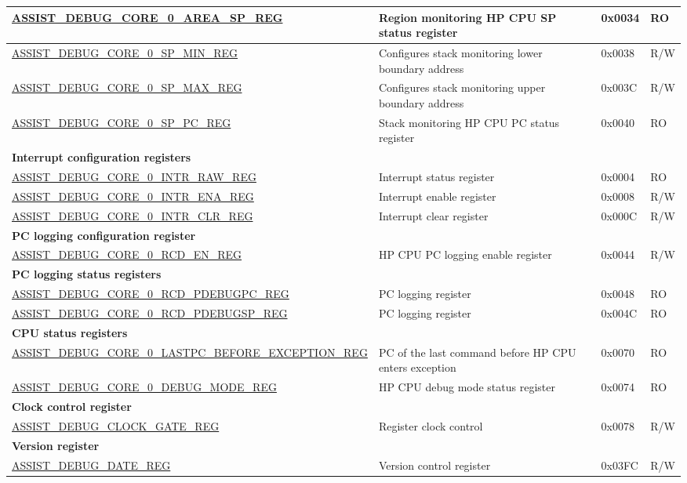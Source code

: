 \begin{longtable}{ | l| m{4cm} | l | l | }
\hyperref[regdesc:ASSISTDEBUGCORE0AREASPREG]{ASSIST\_DEBUG\_CORE\_0\_AREA\_SP\_REG} & Region monitoring HP CPU SP status register & 0x0034 & RO \\ \hline
\hyperref[regdesc:ASSISTDEBUGCORE0SPMINREG]{ASSIST\_DEBUG\_CORE\_0\_SP\_MIN\_REG} & Configures stack monitoring lower boundary address & 0x0038 & R/W \\ \hline
\hyperref[regdesc:ASSISTDEBUGCORE0SPMAXREG]{ASSIST\_DEBUG\_CORE\_0\_SP\_MAX\_REG} & Configures stack monitoring upper boundary address & 0x003C & R/W \\ \hline
\hyperref[regdesc:ASSISTDEBUGCORE0SPPCREG]{ASSIST\_DEBUG\_CORE\_0\_SP\_PC\_REG} & Stack monitoring HP CPU PC status register & 0x0040 & RO \\ \hline
\multicolumn{4}{|l|}{\textbf{Interrupt configuration registers}} \\ \hline
\hyperref[regdesc:ASSISTDEBUGCORE0INTRRAWREG]{ASSIST\_DEBUG\_CORE\_0\_INTR\_RAW\_REG} & Interrupt status register & 0x0004 & RO \\ \hline
\hyperref[regdesc:ASSISTDEBUGCORE0INTRENAREG]{ASSIST\_DEBUG\_CORE\_0\_INTR\_ENA\_REG} & Interrupt enable register & 0x0008 & R/W \\ \hline
\hyperref[regdesc:ASSISTDEBUGCORE0INTRCLRREG]{ASSIST\_DEBUG\_CORE\_0\_INTR\_CLR\_REG} & Interrupt clear register & 0x000C & R/W \\ \hline
\multicolumn{4}{|l|}{\textbf{PC logging configuration register}} \\ \hline
\hyperref[regdesc:ASSISTDEBUGCORE0RCDENREG]{ASSIST\_DEBUG\_CORE\_0\_RCD\_EN\_REG} & HP CPU PC logging enable register & 0x0044 & R/W \\ \hline
\multicolumn{4}{|l|}{\textbf{PC logging status registers}} \\ \hline
\hyperref[regdesc:ASSISTDEBUGCORE0RCDPDEBUGPCREG]{ASSIST\_DEBUG\_CORE\_0\_RCD\_PDEBUGPC\_REG} & PC logging register & 0x0048 & RO \\ \hline
\hyperref[regdesc:ASSISTDEBUGCORE0RCDPDEBUGSPREG]{ASSIST\_DEBUG\_CORE\_0\_RCD\_PDEBUGSP\_REG} & PC logging register & 0x004C & RO \\ \hline
\multicolumn{4}{|l|}{\textbf{CPU status registers}} \\ \hline
\hyperref[regdesc:ASSISTDEBUGCORE0LASTPCBEFOREEXCEPTIONREG]{ASSIST\_DEBUG\_CORE\_0\_LASTPC\_BEFORE\_EXCEPTION\_REG} & PC of the last command before HP CPU enters exception & 0x0070 & RO \\ \hline
\hyperref[regdesc:ASSISTDEBUGCORE0DEBUGMODEREG]{ASSIST\_DEBUG\_CORE\_0\_DEBUG\_MODE\_REG} & HP CPU debug mode status register & 0x0074 & RO \\ \hline
\multicolumn{4}{|l|}{\textbf{Clock control register}} \\ \hline
\hyperref[regdesc:ASSISTDEBUGCLOCKGATEREG]{ASSIST\_DEBUG\_CLOCK\_GATE\_REG} &  Register clock control & 0x0078 & R/W \\ \hline
\multicolumn{4}{|l|}{\textbf{Version register}} \\ \hline
\hyperref[regdesc:ASSISTDEBUGDATEREG]{ASSIST\_DEBUG\_DATE\_REG} & Version control register & 0x03FC & R/W \\ \hline
\end{longtable}
